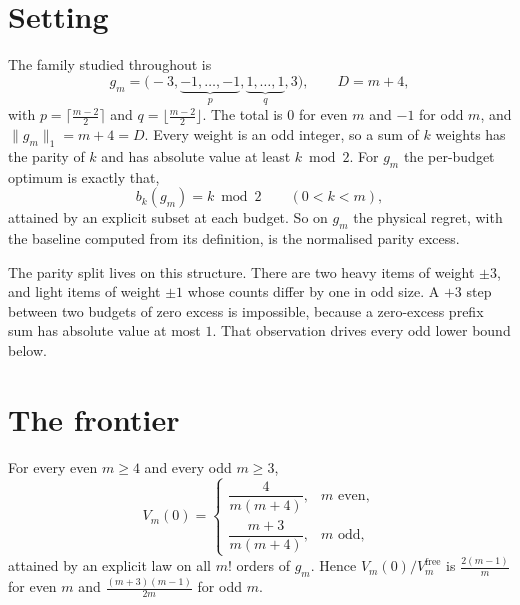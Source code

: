 \section{Setting}
\label{sec:setting}

The family studied throughout is
\begin{equation}
g_{m}=\bigl(-3,\underbrace{-1,\dots,-1}_{p},\underbrace{1,\dots,1}_{q},3\bigr),
\qquad D=m+4,
\label{eq:family}
\end{equation}
with $p=\lceil\frac{m-2}{2}\rceil$ and $q=\lfloor\frac{m-2}{2}\rfloor$. The total is $0$ for
even $m$ and $-1$ for odd $m$, and $\|g_{m}\|_{1}=m+4=D$. Every weight is an odd integer, so
a sum of $k$ weights has the parity of $k$ and has absolute value at least $k\bmod2$. For
$g_{m}$ the per-budget optimum is exactly that,
\begin{equation}
b_{k}(g_{m})=k\bmod 2\qquad(0<k<m),
\label{eq:baseline}
\end{equation}
attained by an explicit subset at each budget. So on $g_{m}$ the physical regret, with the
baseline computed from its definition, is the normalised parity excess.


The parity split lives on this structure. There are two heavy items of weight $\pm3$, and
light items of weight $\pm1$ whose counts differ by one in odd size. A $+3$ step between two
budgets of zero excess is impossible, because a zero-excess prefix sum has absolute value at
most $1$. That observation drives every odd lower bound below.

\section{The frontier}
\label{sec:frontier}

\begin{theorem}
\label{thm:zero}
For every even $m\ge4$ and every odd $m\ge3$,
\[
V_{m}(0)=
\begin{cases}
\dfrac{4}{m(m+4)}, & m\text{ even},\\[8pt]
\dfrac{m+3}{m(m+4)}, & m\text{ odd},
\end{cases}
\]
attained by an explicit law on all $m!$ orders of $g_{m}$. Hence
$V_{m}(0)/V^{\mathrm{free}}_{m}$ is $\frac{2(m-1)}{m}$ for even $m$ and
$\frac{(m+3)(m-1)}{2m}$ for odd $m$.
\end{theorem}

